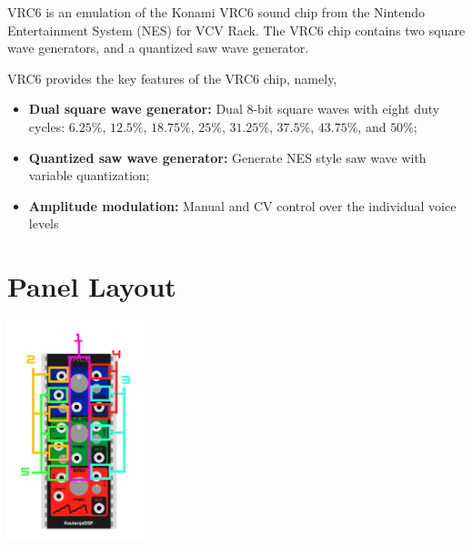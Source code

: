 \documentclass[12pt,a4paper]{article}
\begin{document}
VRC6 is an emulation of the Konami VRC6 sound chip from the Nintendo Entertainment System (NES) for VCV Rack. The VRC6 chip contains two square wave generators, and a quantized saw wave generator.

VRC6 provides the key features of the VRC6 chip, namely,
\begin{itemize}
  \item \textbf{Dual square wave generator:} Dual 8-bit square waves with eight duty cycles: $6.25\%$, $12.5\%$, $18.75\%$, $25\%$, $31.25\%$, $37.5\%$, $43.75\%$, and $50\%$;
  \item \textbf{Quantized saw wave generator:} Generate NES style saw wave with variable quantization;
  \item \textbf{Amplitude modulation:} Manual and CV control over the individual voice levels
\end{itemize}


\section{Panel Layout}

\begin{center}
\includegraphics[width=0.3\textwidth]{VRC6-Manual}
\end{center}



\clearpage
\renewcommand\refname{References \& Acknowledgments}
\nocite{*}


\end{document}
